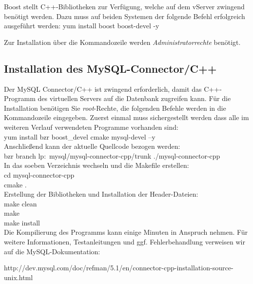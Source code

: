 \documentclass[fontsize = 12pt, paper = a4]{scrreprt}
\begin{document}
Boost stellt C++-Bibliotheken zur Verfügung, welche auf dem vServer zwingend benötigt werden.
Dazu muss auf beiden Systemen der folgende Befehl erfolgreich ausgeführt werden:
    yum install boost boost-devel -y
    
Zur Installation über die Kommandozeile werden \textit{Administratorrechte} benötigt.

\subsection{Installation des MySQL-Connector/C++}

Der MySQL Connector/C++ ist zwingend erforderlich, damit das C++-Programm des virtuellen Servers auf die Datenbank zugreifen kann. Für die Installation benötigen Sie \textit{root}-Rechte, die folgenden Befehle werden in die Kommandozeile eingegeben.
Zuerst einmal muss sichergestellt werden dass alle im weiteren Verlauf verwendeten Programme vorhanden sind:\\
  yum install bzr boost\_devel cmake mysql-devel –y \\

Anschließend kann der aktuelle Quellcode bezogen werden:\\
  bzr branch lp:~mysql/mysql-connector-cpp/trunk ./mysql-connector-cpp \\

In das soeben Verzeichnis wechseln und die Makefile erstellen:\\
  cd mysql-connector-cpp \\
  cmake . \\

Erstellung der Bibliotheken und Installation der Header-Dateien: \\
  make clean \\
  make \\
  make install \\

Die Kompilierung des Programms kann einige Minuten in Anspruch nehmen. Für weitere Informationen, Testanleitungen und ggf. Fehlerbehandlung verweisen wir auf die MySQL-Dokumentation:

 http://dev.mysql.com/doc/refman/5.1/en/connector-cpp-installation-source-unix.html
 
\end{document}
